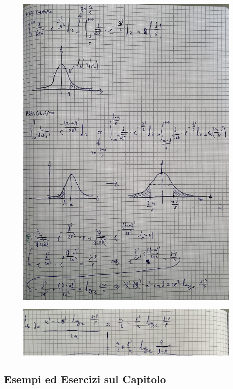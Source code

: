 \documentclass{article}
\begin{document}
\begin{figure}[H]
\centering
\includegraphics[scale=0.10]{ese/24e.jpeg}
\end{figure} 
\begin{figure}[H]
\centering
\includegraphics[scale=0.10]{ese/24f.jpeg}
\end{figure} 

\subsection{Esempi ed Esercizi sul Capitolo}
\end{document}

